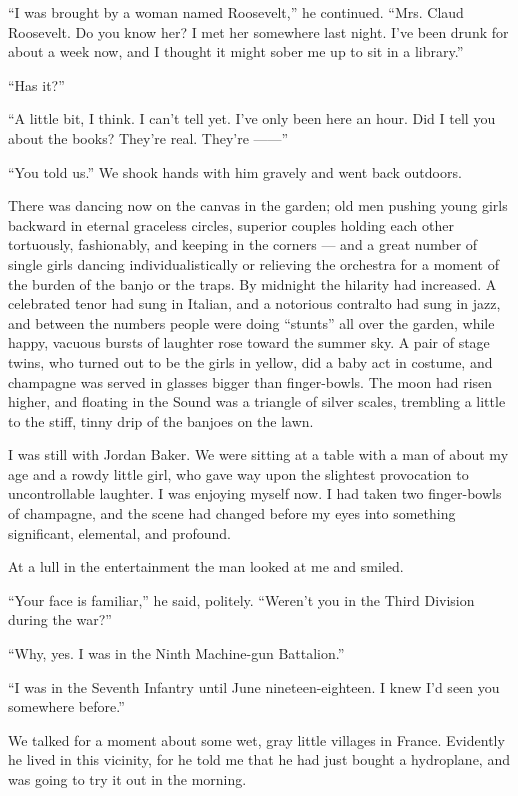\documentclass{znotebook}
\begin{document}
``I was brought by a woman named Roosevelt,'' he continued. ``Mrs. Claud Roosevelt. Do you know her? I met her somewhere last night. I’ve been drunk for about a week now, and I thought it might sober me up to sit in a library.''

``Has it?''

``A little bit, I think. I can’t tell yet. I’ve only been here an hour. Did I tell you about the books? They’re real. They’re ——''

``You told us.'' We shook hands with him gravely and went back outdoors.

There was dancing now on the canvas in the garden; old men pushing young girls backward in eternal graceless circles, superior couples holding each other tortuously, fashionably, and keeping in the corners — and a great number of single girls dancing individualistically or relieving the orchestra for a moment of the burden of the banjo or the traps. By midnight the hilarity had increased. A celebrated tenor had sung in Italian, and a notorious contralto had sung in jazz, and between the numbers people were doing ``stunts'' all over the garden, while happy, vacuous bursts of laughter rose toward the summer sky. A pair of stage twins, who turned out to be the girls in yellow, did a baby act in costume, and champagne was served in glasses bigger than finger-bowls. The moon had risen higher, and floating in the Sound was a triangle of silver scales, trembling a little to the stiff, tinny drip of the banjoes on the lawn.

I was still with Jordan Baker. We were sitting at a table with a man of about my age and a rowdy little girl, who gave way upon the slightest provocation to uncontrollable laughter. I was enjoying myself now. I had taken two finger-bowls of champagne, and the scene had changed before my eyes into something significant, elemental, and profound.

At a lull in the entertainment the man looked at me and smiled.

``Your face is familiar,'' he said, politely. ``Weren’t you in the Third Division during the war?''

``Why, yes. I was in the Ninth Machine-gun Battalion.''

``I was in the Seventh Infantry until June nineteen-eighteen. I knew I’d seen you somewhere before.''

We talked for a moment about some wet, gray little villages in France. Evidently he lived in this vicinity, for he told me that he had just bought a hydroplane, and was going to try it out in the morning.
\end{document}
